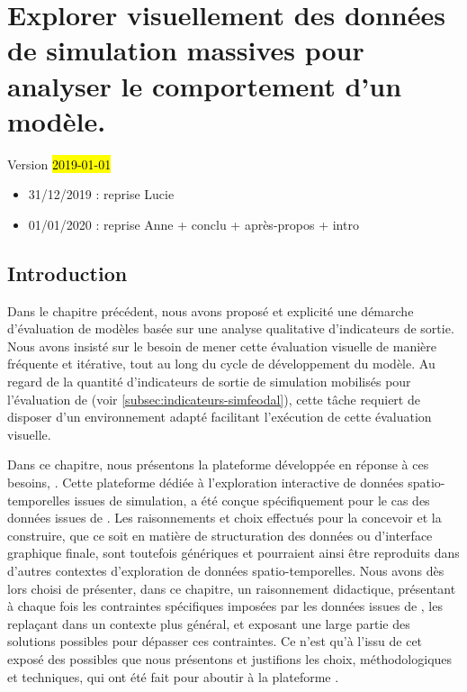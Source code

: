 \setcounter{chapter}{3}
\graphicspath{{chap4/}}

\chapter{Explorer visuellement des données de simulation massives pour analyser le comportement d'un modèle.}
\label{chap:chap4}
\begin{center}
{\large Version \hl{2019-01-01}}
\end{center}
\begin{itemize}
	\item 31/12/2019 : reprise Lucie
	\item 01/01/2020 : reprise Anne + conclu + après-propos + intro
\end{itemize} 
\setcounter{minitocdepth}{2}
\minitoc
\clearpage
{}

\section*{Introduction}

Dans le chapitre précédent, nous avons proposé et explicité une démarche d'évaluation de modèles basée sur une analyse qualitative d'indicateurs de sortie.
Nous avons insisté sur le besoin de mener cette \og évaluation visuelle\fg{} de manière fréquente et itérative, tout au long du cycle de développement du modèle.
Au regard de la quantité d'indicateurs de sortie de simulation mobilisés pour l'évaluation de \simfeodal{} (voir \cref{subsec:indicateurs-simfeodal}), cette tâche requiert de disposer d'un environnement adapté facilitant l'exécution de cette évaluation visuelle.

Dans ce chapitre, nous présentons la plateforme développée en réponse à ces besoins, \simedb{}.
Cette plateforme dédiée à l'exploration interactive de données spatio-temporelles issues de simulation, a été conçue spécifiquement pour le cas des données issues de \simfeodal{}.
Les raisonnements et choix effectués pour la concevoir et la construire, que ce soit en matière de structuration des données ou d'interface graphique finale, sont toutefois génériques et pourraient ainsi être reproduits dans d'autres contextes d'exploration de données spatio-temporelles.
Nous avons dès lors choisi de présenter, dans ce chapitre, un raisonnement didactique, présentant à chaque fois les contraintes spécifiques imposées par les données issues de \simfeodal{}, les replaçant dans un contexte plus général, et exposant une large partie des solutions possibles pour dépasser ces contraintes.
Ce n'est qu'à l'issu de cet exposé des possibles que nous présentons et justifions les choix, méthodologiques et techniques, qui ont été fait pour aboutir à la plateforme \simedb.	

